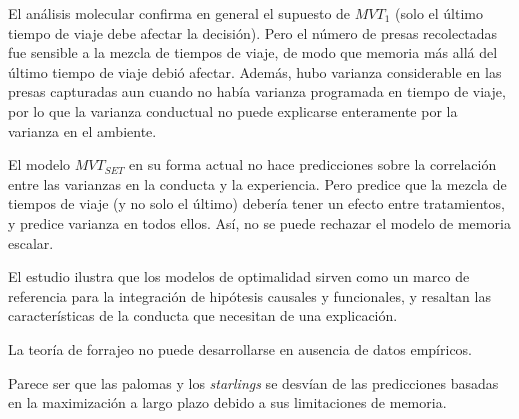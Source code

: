 \documentclass[a4paper,12pt]{article}
\begin{document}
El análisis molecular confirma en general el supuesto de $MVT_{1}$ (solo el último tiempo de viaje debe afectar la decisión). Pero el número de presas recolectadas fue sensible a la mezcla de tiempos de viaje, de modo que memoria más allá del último tiempo de viaje debió afectar. Además, hubo varianza considerable en las presas capturadas aun cuando no había varianza programada en tiempo de viaje, por lo que la varianza conductual no puede explicarse enteramente por la varianza en el ambiente.

El modelo $MVT_{SET}$ en su forma actual no hace predicciones sobre la correlación entre las varianzas en la conducta y la experiencia. Pero predice que la mezcla de tiempos de viaje (y no solo el último) debería tener un efecto entre tratamientos, y predice varianza en todos ellos. Así, no se puede rechazar el modelo de memoria escalar.

El estudio ilustra que los modelos de optimalidad sirven como un marco de referencia para la integración de hipótesis causales y funcionales, y resaltan las características de la conducta que necesitan de una explicación.

La teoría de forrajeo no puede desarrollarse en ausencia de datos empíricos.

Parece ser que las palomas y los {\itshape starlings} se desvían de las predicciones basadas en la maximización a largo plazo debido a sus limitaciones de memoria.
\end{document}
